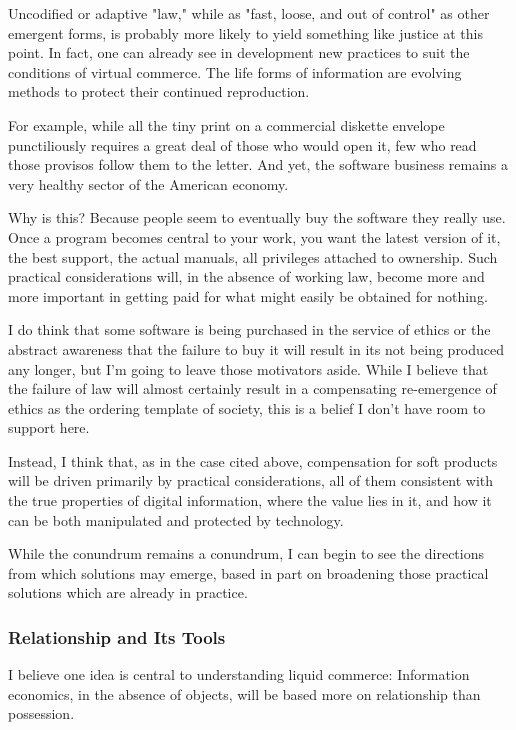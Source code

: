 \documentclass[
]{article}
\begin{document}
Uncodified or adaptive "law," while as "fast, loose, and out of control"
as other emergent forms, is probably more likely to yield something like
justice at this point. In fact, one can already see in development new
practices to suit the conditions of virtual commerce. The life forms of
information are evolving methods to protect their continued
reproduction.

For example, while all the tiny print on a commercial diskette envelope
punctiliously requires a great deal of those who would open it, few who
read those provisos follow them to the letter. And yet, the software
business remains a very healthy sector of the American economy.

Why is this? Because people seem to eventually buy the software they
really use. Once a program becomes central to your work, you want the
latest version of it, the best support, the actual manuals, all
privileges attached to ownership. Such practical considerations will, in
the absence of working law, become more and more important in getting
paid for what might easily be obtained for nothing.

I do think that some software is being purchased in the service of
ethics or the abstract awareness that the failure to buy it will result
in its not being produced any longer, but I'm going to leave those
motivators aside. While I believe that the failure of law will almost
certainly result in a compensating re-emergence of ethics as the
ordering template of society, this is a belief I don't have room to
support here.

Instead, I think that, as in the case cited above, compensation for soft
products will be driven primarily by practical considerations, all of
them consistent with the true properties of digital information, where
the value lies in it, and how it can be both manipulated and protected
by technology.

While the conundrum remains a conundrum, I can begin to see the
directions from which solutions may emerge, based in part on broadening
those practical solutions which are already in practice.

\hypertarget{header-n359}{%
\subsubsection{Relationship and Its Tools}\label{header-n359}}

I believe one idea is central to understanding liquid commerce:
Information economics, in the absence of objects, will be based more on
relationship than possession.
\end{document}
